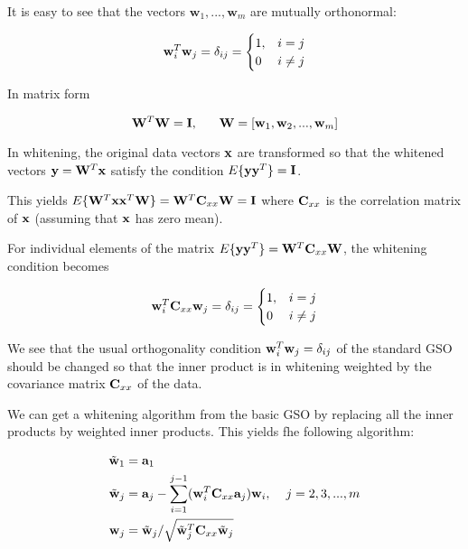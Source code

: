 \begin{enumerate}
\begin{solution}
    It is easy to see that the vectors $\textbf{w}_1, ..., \textbf{w}_m$ are mutually
    orthonormal: 

    \[\mathbf{w}_i^T\mathbf{w}_j = \delta_{ij} = \begin{cases}1, &i=j\\0 &i\neq
      j\end{cases}
    \]

    In matrix form

    \[
    \mathbf{W}^T\mathbf{W} = \mathbf{I}, \hspace{6mm}\mathbf{W} = [\mathbf{w}_1, \mathbf{w}_2, ..., \mathbf{w}_m]
    \]

    In whitening, the original data vectors $\mathbf{x}$ are transformed so
    that the whitened vectors $\textbf{y}=\mathbf{W}^T\mathbf{x}$ satisfy the condition
    $E\lbrace \textbf{y}\textbf{y}^T \rbrace=\mathbf{I}$.

    This yields
    $E\lbrace \mathbf{W}^T\mathbf{x}\mathbf{x}^T\mathbf{W}\rbrace=\mathbf{W}^T \textbf{C}_{xx} \mathbf{W}=\mathbf{I}$
    where $\mathbf{C}_{xx}$ is the correlation matrix of $\mathbf{x}$
    (assuming that $\mathbf{x}$ has zero mean).

    For individual elements of the matrix $E\lbrace \mathbf{y}\mathbf{y}^T\rbrace=\mathbf{W}^T\mathbf{C}_{xx}\mathbf{W}$, the whitening condition becomes

    \[
    \mathbf{w}_i^T\mathbf{C}_{xx}\mathbf{w}_j = \delta_{ij} = \begin{cases}1, &i=j\\0 &i\neq
      j\end{cases}
    \]


    We see that the usual orthogonality
    condition $\mathbf{w}_i^T\mathbf{w}_j = \delta_{ij}$ of the standard GSO
    should be changed so that the inner product is in whitening weighted by the covariance
    matrix $\mathbf{C}_{xx}$ of the data.

    We can get a whitening algorithm from the basic GSO by replacing all
    the inner products by weighted inner products. This yields fhe
    following algorithm:

    \[
    \begin{split}
      \tilde{\mathbf{w}}_1 &= \mathbf{a}_1 \\
      \tilde{\mathbf{w}}_j &= \mathbf{a}_j - \sum_{i=1}^{j-1}
      (\mathbf{w}_i^T\mathbf{C}_{xx}\mathbf{a}_j)\mathbf{w}_i, \hspace{4mm} j=2,3,...,m \\
      \mathbf{w}_j &= \tilde{\mathbf{w}}_j/\sqrt{\tilde{\mathbf{w}}_j^T\mathbf{C}_{xx}\tilde{\mathbf{w}}_j}
    \end{split}
    \]


\end{solution}
\end{enumerate}
